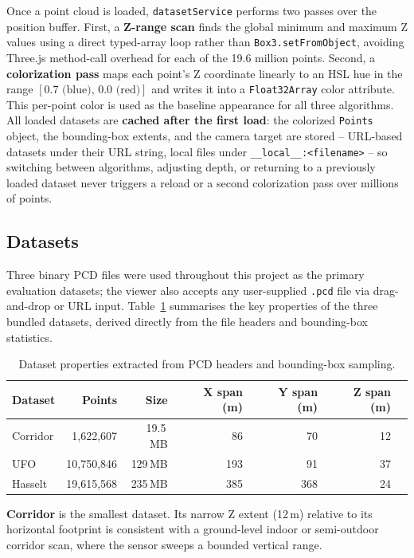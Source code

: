 \documentclass[12pt,a4paper]{article}
\begin{document}
Once a point cloud is loaded, \texttt{datasetService} performs two passes over
the position buffer. First, a \textbf{Z-range scan} finds the global minimum and
maximum Z values using a direct typed-array loop rather than
\texttt{Box3.setFromObject}, avoiding Three.js method-call overhead for each of
the 19.6 million points. Second, a \textbf{colorization pass} maps each point's
Z coordinate linearly to an HSL hue in the range
$[0.7\text{ (blue)},\, 0.0\text{ (red)}]$ and writes it into a
\texttt{Float32Array} color attribute. This per-point color is used as the
baseline appearance for all three algorithms. All loaded datasets are \textbf{cached after the first load}: the colorized
\texttt{Points} object, the bounding-box extents, and the camera target are
stored -- URL-based datasets under their URL string, local files under
\texttt{\_\_local\_\_:<filename>} -- so switching between algorithms, adjusting
depth, or returning to a previously loaded dataset never triggers a reload or a
second colorization pass over millions of points.

\subsection{Datasets}

Three binary PCD files were used throughout this project as the primary
evaluation datasets; the viewer also accepts any user-supplied \texttt{.pcd}
file via drag-and-drop or URL input.
Table~\ref{tab:datasets} summarises the key properties of the three bundled
datasets, derived directly from the file headers and bounding-box statistics.

\begin{table}[H]
\centering
\begin{tabular}{@{}lrrrrrr@{}}
\toprule
\textbf{Dataset} & \textbf{Points} & \textbf{Size} &
  \textbf{X span (m)} & \textbf{Y span (m)} & \textbf{Z span (m)} \\
\midrule
Corridor & 1{,}622{,}607  & 19.5\,MB  &  86 &  70 & 12 \\
UFO      & 10{,}750{,}846 & 129\,MB   & 193 &  91 & 37 \\
Hasselt  & 19{,}615{,}568 & 235\,MB   & 385 & 368 & 24 \\
\bottomrule
\end{tabular}
\caption{Dataset properties extracted from PCD headers and bounding-box sampling.}
\label{tab:datasets}
\end{table}

\textbf{Corridor} is the smallest dataset. Its narrow Z extent (12\,m) relative
to its horizontal footprint is consistent with a ground-level indoor or
semi-outdoor corridor scan, where the sensor sweeps a bounded vertical range.
\end{document}
